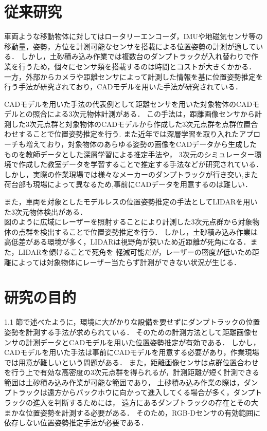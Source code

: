 \newpage

\section{従来研究}
車両ような移動物体に対してはロータリーエンコーダ，IMUや地磁気センサ等の移動量，姿勢，方位を計測可能なセンサを搭載による位置姿勢の計測が適している．
しかし，土砂積み込み作業では複数台のダンプトラックが入れ替わりで作業を行うため，個々にセンサ類を搭載するのは時間とコストが大きくかかる．
一方，外部からカメラや距離センサによって計測した情報を基に位置姿勢推定を行う手法が研究されており，CADモデルを用いた手法が研究されている\cite{中原智治2001}\cite{西卓郎2014}．
\par
CADモデルを用いた手法の代表例として距離センサを用いた対象物体のCADモデルとの照合による3次元物体計測がある\cite{林2008}．
この手法は，距離画像センサから計測した3次元点群と対象物体のCADモデルから作成した3次元点群を点群位置合わせすることで位置姿勢推定を行う.
また近年では深層学習を取り入れたアプローチも増えており，対象物体のあらゆる姿勢の画像をCADデータから生成したものを教師データとした深層学習による推定手法\cite{Sundermeyer2018}や，
3次元のシミュレーター環境で作成した教室データを学習することで推定する手法\cite{Tremblay2018}などが研究されている．
しかし，実際の作業現場では様々なメーカーのダンプトラックが行き交い,また荷台部も現場によって異なるため,事前にCADデータを用意するのは難しい．

また，車両を対象としたモデルレスの位置姿勢推定の手法としてLIDARを用いた3次元物体検出がある．\cite{Zhang2017}\cite{Chen2017}\cite{Lang2019}\\
図のように広域にレーザーを照射することにより計測した3次元点群から対象物体の点群を検出することで位置姿勢推定を行う．
しかし，土砂積み込み作業は高低差がある環境が多く，LIDARは視野角が狭いため近距離が死角になる．また，LIDARを傾けることで死角を
軽減可能だが，レーザーの密度が低いため距離によっては対象物体にレーザー当たらず計測ができない状況が生じる．

\newpage
\section{研究の目的}
1.1 節で述べたように，環境に大がかりな設備を要せずにダンプトラックの位置姿勢を計測する手法が求められている．
そのための計測方法として距離画像センサの計測データとCADモデルを用いた位置姿勢推定が有効である．
しかし，CADモデルを用いた手法は事前にCADモデルを用意する必要があり，作業現場では用意が難しいという問題がある．
また，距離画像センサは点群位置合わせを行う上で有効な高密度の3次元点群を得られるが，計測距離が短く計測できる範囲は土砂積み込み作業が可能な範囲であり，
土砂積み込み作業の際は，ダンプトラックは遠方からバックホウに向かって進入してくる場合が多く，ダンプトラックの進入を判断するためには，
遠方にあるダンプトラックの存在とその大まかな位置姿勢を計測する必要がある．
そのため，RGB-Dセンサの有効範囲に依存しない位置姿勢推定手法が必要である．



